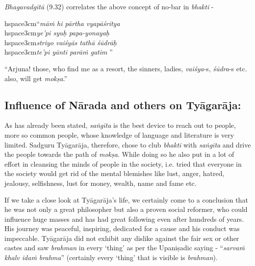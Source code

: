 \textit{Bhagavadgītā} (9.32) correlates the above concept of no-bar in \textit{bhakti} -

\begin{myquote}
hspace{3cm}“\textit{māṁ hi pārtha vyapāśritya}\\hspace{3cm}\textit{ye’pi syuḥ papa-yonayaḥ }\\hspace{3cm}\textit{striyo vaiśyās tathā śūdrāḥ} \\hspace{3cm}\textit{te’pi yānti parāṁ gatim }”
\end{myquote}

``Arjuna! those, who find me as a resort, the sinners, ladies, \textit{vaiśya}-s, \textit{śūdra}-s etc. also, will get \textit{mokṣa}.''


\subsection*{Influence of Nārada and others on Tyāgarāja:}

\vspace{-.3cm}

As has already been stated, \textit{saṅgīta} is the best device to reach out to people, more so common people, whose knowledge of language and literature is very limited. Sadguru Tyāgarāja, therefore, chose to club \textit{bhakti} with \textit{saṅgīta} and drive the people towards the path of \textit{mokṣa}. While doing so he also put in a lot of effort in cleansing the minds of people in the society, i.e. tried that everyone in the society would get rid of the mental blemishes like lust, anger, hatred, jealousy, selfishness, lust for money, wealth, name and fame etc. 

If we take a close look at Tyāgarāja’s life, we certainly come to a conclusion that he was not only a great philosopher but also a proven social reformer, who could influence huge masses and has had great following even after hundreds of years. His journey was peaceful, inspiring, dedicated for a cause and his conduct was impeccable. Tyāgarāja did not exhibit any dislike against the fair sex or other castes and saw \textit{brahman} in every ‘thing’ as per the Upaniṣadic saying - “\textit{sarvaṁ khalv idaṁ brahma}” (certainly every ‘thing’ that is visible is \textit{brahman}).

